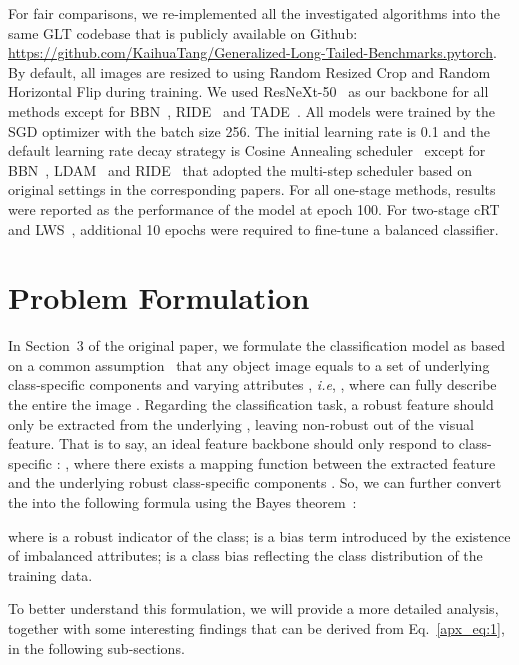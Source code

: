 \documentclass{article}
\def\ie{\emph{i.e}} \def\Ie{\emph{I.e}}
\begin{document}
For fair comparisons, we re-implemented all the investigated algorithms into the same GLT codebase that is publicly available on Github: \url{https://github.com/KaihuaTang/Generalized-Long-Tailed-Benchmarks.pytorch}. By default, all images are resized to  using Random Resized Crop and Random Horizontal Flip during training. We used ResNeXt-50~\cite{xie2017aggregated} as our backbone for all methods except for BBN~\cite{zhou2019bbn}, RIDE~\cite{wang2020long} and TADE~\cite{zhang2021test}. All models were trained by the SGD optimizer with the batch size 256. The initial learning rate is 0.1 and the default learning rate decay strategy is Cosine Annealing scheduler~\cite{loshchilov2016sgdr} except for BBN~\cite{zhou2019bbn}, LDAM~\cite{cao2019ldam} and RIDE~\cite{wang2020long} that adopted the multi-step scheduler based on original settings in the corresponding papers. For all one-stage methods, results were reported as the performance of the model at epoch 100. For two-stage cRT~\cite{kang2019decoupling} and LWS~\cite{kang2019decoupling}, additional 10 epochs were required to fine-tune a balanced classifier. 


    




\section{Problem Formulation}
In Section~3 of the original paper, we formulate the classification model  as  based on a common assumption~\cite{mirza2014conditional} that any object image  equals to a set of underlying class-specific components  and varying attributes , \ie, , where  can fully describe the entire the image . Regarding the classification task, a robust feature should only be extracted from the underlying , leaving non-robust  out of the visual feature. That is to say, an ideal feature backbone  should only respond to class-specific : , where there exists a mapping function  between the extracted feature  and the underlying robust class-specific components . So, we can further convert the  into the following formula using the Bayes theorem~\cite{stone2013bayes}:

where  is a robust indicator of the class;  is a bias term introduced by the existence of imbalanced attributes;  is a class bias reflecting the class distribution of the training data.

To better understand this formulation, we will provide a more detailed analysis, together with some interesting findings that can be derived from Eq.~\eqref{apx_eq:1}, in the following sub-sections.
\end{document}
